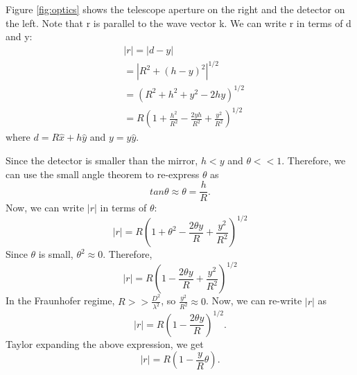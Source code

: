 \begin{enumerate}
      Figure \ref{fig:optics} shows the telescope aperture on the right and the detector on the left. Note that r is parallel to the wave vector k. We can write r in terms of d and y:
      \begin{equation}
 	\begin{aligned}
    	&|r| = |d-y|\\
     	 &=|R^2 +(h-y)^2|^{1/2}\\
	 &=(R^2+h^2 +y^2-2hy)^{1/2}\\
	 &=R(1+\frac{h^2}{R^2}-\frac{2yh}{R^2}+\frac{y^2}{R^2})^{1/2}
  	\end{aligned}
	\label{eqn:r}
      \end{equation}
      where $d = R\hat{x}+h\hat{y}$ and $y = y \hat{y}$. 
      
      Since the detector is smaller than the mirror, $h<y$ and $\theta << 1$. Therefore, we can use the small angle theorem to re-express $\theta$ as 
      \begin{equation}
      tan\theta \approx \theta = \frac{h}{R}.
      \end{equation}
      Now, we can write $|r|$ in terms of $\theta$:
      \begin{equation}
      |r| = R\left( 1+\theta^2 - \frac{2 \theta y}{R} + \frac{y^2}{R^2}  \right)^{1/2}
      \label{eqn:r2}
      \end{equation}
      Since $\theta$ is small, $\theta^2 \approx 0$. Therefore, 
      \begin{equation}
      |r| = R \left(  1-\frac{2 \theta y}{R} + \frac{y^2}{R^2} \right)^{1/2}
      \end{equation}
      In the Fraunhofer regime, $R>> \frac{D^2}{\lambda^2}$, so $\frac{y^2}{R^2} \approx 0$. Now, we can re-write $|r|$ as 
      \begin{equation}
      |r| = R(1-\frac{2 \theta y}{R})^{1/2}.
      \end{equation}
      Taylor expanding the above expression, we get 
      \begin{equation}
      |r| = R(1-\frac{y}{R}\theta).
      \label{eqn:r5}
      \end{equation}
      

\end{enumerate}
